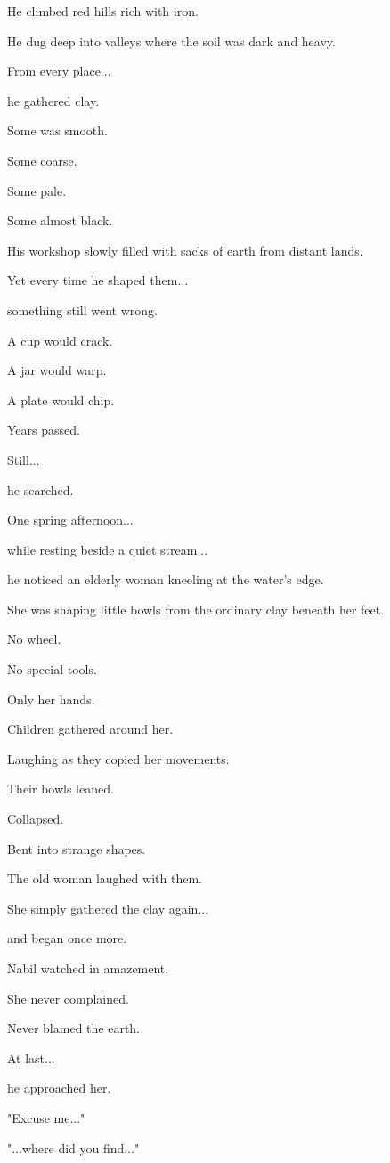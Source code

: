 \documentclass[12pt,openany]{book}
\begin{document}
He climbed red hills rich with iron.

He dug deep into valleys where the soil was dark and heavy.

From every place...

he gathered clay.

Some was smooth.

Some coarse.

Some pale.

Some almost black.

His workshop slowly filled with sacks of earth from distant lands.

Yet every time he shaped them...

something still went wrong.

A cup would crack.

A jar would warp.

A plate would chip.

Years passed.

Still...

he searched.

One spring afternoon...

while resting beside a quiet stream...

he noticed an elderly woman kneeling at the water's edge.

She was shaping little bowls from the ordinary clay beneath her feet.

No wheel.

No special tools.

Only her hands.

Children gathered around her.

Laughing as they copied her movements.

Their bowls leaned.

Collapsed.

Bent into strange shapes.

The old woman laughed with them.

She simply gathered the clay again...

and began once more.

Nabil watched in amazement.

She never complained.

Never blamed the earth.

At last...

he approached her.

"Excuse me..."

"...where did you find..."
\end{document}
